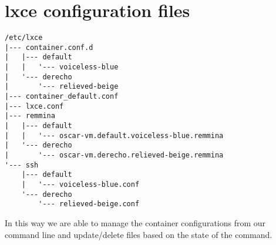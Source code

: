 \newpage\section{lxce configuration files}\label{annex:conf}

\begin{verbatim}
/etc/lxce 
|--- container.conf.d 			
|   |--- default 			
|   |   '--- voiceless-blue
|   '--- derecho 			
|       '--- relieved-beige
|--- container_default.conf 		
|--- lxce.conf 			
|--- remmina 		
|   |--- default 
|   |   '--- oscar-vm.default.voiceless-blue.remmina
|   '--- derecho 
|       '--- oscar-vm.derecho.relieved-beige.remmina
'--- ssh 	
    |--- default 
    |   '--- voiceless-blue.conf
    '--- derecho
        '--- relieved-beige.conf
\end{verbatim}

In this way we are able to manage the container configurations from our command line and update/delete files based on the state of the command.

